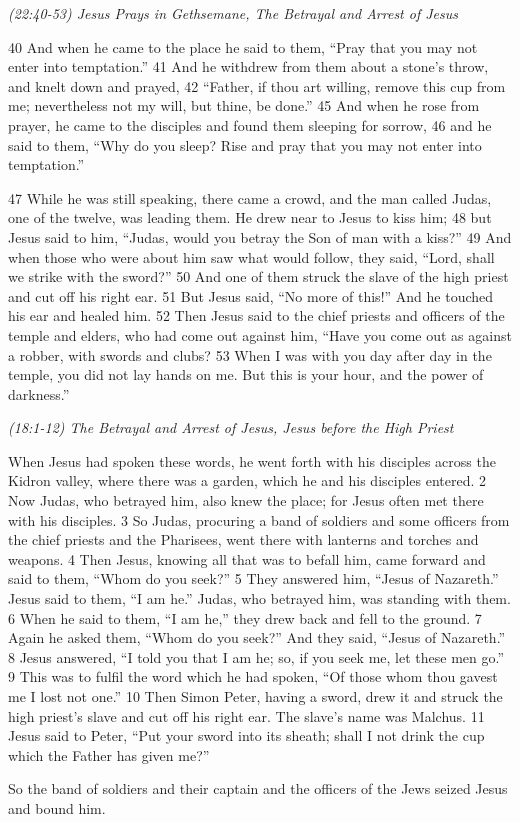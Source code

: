 \documentclass[letterpaper]{report}
\begin{document}
{\centering
	\emph{(22:40-53) Jesus Prays in Gethsemane, The Betrayal and Arrest of Jesus}\\
}
\begin{multicols}{2}
40 And when he came to the place he said to them, “Pray that you may not enter into temptation.” 41 And he withdrew from them about a stone’s throw, and knelt down and prayed, 42 “Father, if thou art willing, remove this cup from me; nevertheless not my will, but thine, be done.” 45 And when he rose from prayer, he came to the disciples and found them sleeping for sorrow, 46 and he said to them, “Why do you sleep? Rise and pray that you may not enter into temptation.”

47 While he was still speaking, there came a crowd, and the man called Judas, one of the twelve, was leading them. He drew near to Jesus to kiss him; 48 but Jesus said to him, “Judas, would you betray the Son of man with a kiss?” 49 And when those who were about him saw what would follow, they said, “Lord, shall we strike with the sword?” 50 And one of them struck the slave of the high priest and cut off his right ear. 51 But Jesus said, “No more of this!” And he touched his ear and healed him. 52 Then Jesus said to the chief priests and officers of the temple and elders, who had come out against him, “Have you come out as against a robber, with swords and clubs? 53 When I was with you day after day in the temple, you did not lay hands on me. But this is your hour, and the power of darkness.”
\end{multicols}

{\centering
	\emph{(18:1-12) The Betrayal and Arrest of Jesus, Jesus before the High Priest}\\
}
\begin{multicols}{2}
	When Jesus had spoken these words, he went forth with his disciples across the Kidron valley, where there was a garden, which he and his disciples entered. 2 Now Judas, who betrayed him, also knew the place; for Jesus often met there with his disciples. 3 So Judas, procuring a band of soldiers and some officers from the chief priests and the Pharisees, went there with lanterns and torches and weapons. 4 Then Jesus, knowing all that was to befall him, came forward and said to them, “Whom do you seek?” 5 They answered him, “Jesus of Nazareth.” Jesus said to them, “I am he.” Judas, who betrayed him, was standing with them. 6 When he said to them, “I am he,” they drew back and fell to the ground. 7 Again he asked them, “Whom do you seek?” And they said, “Jesus of Nazareth.” 8 Jesus answered, “I told you that I am he; so, if you seek me, let these men go.” 9 This was to fulfil the word which he had spoken, “Of those whom thou gavest me I lost not one.” 10 Then Simon Peter, having a sword, drew it and struck the high priest’s slave and cut off his right ear. The slave’s name was Malchus. 11 Jesus said to Peter, “Put your sword into its sheath; shall I not drink the cup which the Father has given me?”
	
So the band of soldiers and their captain and the officers of the Jews seized Jesus and bound him.
\end{multicols}
\end{document}
